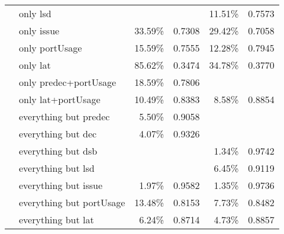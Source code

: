 \documentclass[sigconf,nonacm]{acmart}
\begin{document}
\begin{table}
\begin{center}
\begin{tabular}{llrcrc}
                      & only lsd  & & & 11.51\% & 0.7573\\
                      & only issue  & 33.59\% & 0.7308 & 29.42\% & 0.7058\\
                      & only portUsage  & 15.59\% & 0.7555 & 12.28\% & 0.7945\\
                      & only lat  & 85.62\% & 0.3474 & 34.78\% & 0.3770\\
                      & only predec+portUsage  & 18.59\% & 0.7806 & & \\
                      & only lat+portUsage  & 10.49\% & 0.8383 & 8.58\% & 0.8854\\
                      & everything but predec  & 5.50\% & 0.9058 & & \\
                      & everything but dec  & 4.07\% & 0.9326 & & \\
                      & everything but dsb  & & & 1.34\% & 0.9742\\
                      & everything but lsd  & & & 6.45\% & 0.9119\\
                      & everything but issue  & 1.97\% & 0.9582 & 1.35\% & 0.9736\\
                      & everything but portUsage  & 13.48\% & 0.8153 & 7.73\% & 0.8482\\
                      & everything but lat  & 6.24\% & 0.8714 & 4.73\% & 0.8857\\
\bottomrule
\end{tabular}
\end{center}
\end{table}

\clearpage
\appendix
\end{document}
